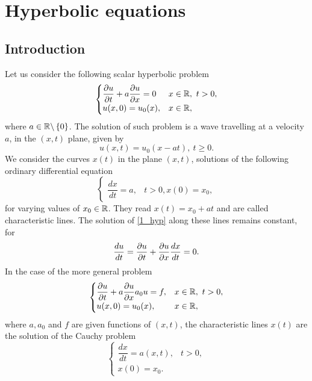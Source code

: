 \newpage
\section{Hyperbolic equations}
\subsection{Introduction}
Let us consider the following scalar hyperbolic problem 
\begin{equation}
    \begin{cases}
        \displaystyle\partialderivative{u}{t} + a\partialderivative{u}{x} = 0 & x\in \real, \ t > 0, \\
        u(x, 0) = u_0 (x), & x\in \real, 
    \end{cases}
    \label{1_hyp}
\end{equation}
where \(a \in \mathbb{R} \backslash \left\{ 0 \right\}\). The solution of such problem is a wave travelling at a velocity \(a\), in the \((x,t)\) plane, given by 
\[
    u(x,t) = u_0(x-at), \ t \geq 0.
\]
We consider the curves \(x(t)\) in the plane \((x,t)\), solutions of the following ordinary differential equation 
\begin{equation*}
    \begin{cases}
        \dfrac{dx}{dt} = a, & t>0,
        x(0) = x_0,
    \end{cases}
\end{equation*}
for varying values of \(x_0 \in \mathbb{R}\). They read \(x(t) = x_0 +at\) and are called characteristic lines. The solution of \eqref{1_hyp} along these lines remains constant, for 
\[
    \frac{du}{dt} = \partialderivative{u}{t} + \partialderivative{u}{x} \frac{dx}{dt} = 0.
\]
In the case of the more general problem
\begin{equation}
    \begin{cases}
        \displaystyle\partialderivative{u}{t}+a\partialderivative{u}{x} a_0u = f, & x\in \real, \ t > 0, \\
        u(x, 0) = u_0(x), & x \in \real,
    \end{cases}
    \label{2_hyp}
\end{equation}
where \(a,a_0\) and \(f\) are given functions of \((x,t)\), the characteristic lines \(x(t)\) are the solution of the Cauchy problem 
\begin{equation*}
    \begin{cases}
        \dfrac{dx}{dt} = a(x,t), & t>0, \\
        x(0) = x_0.
    \end{cases}
\end{equation*}
